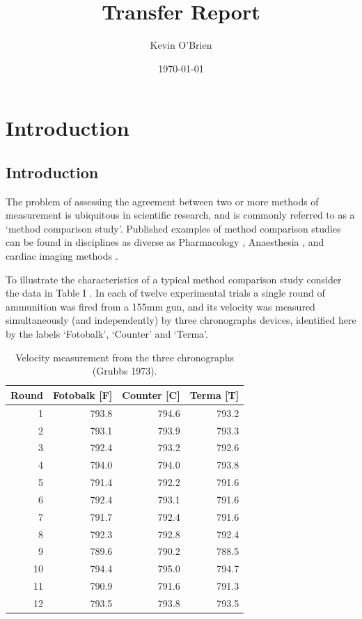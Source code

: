 \documentclass[12pt, a4paper]{report}
\begin{document}
\author{Kevin O'Brien}
\title{Transfer Report}
\date{\today}
\maketitle

\tableofcontents \setcounter{tocdepth}{2}

\newpage
\chapter{Introduction}

\section{Introduction}
The problem of assessing the agreement between two or more methods
of measurement is ubiquitous in scientific research, and is
commonly referred to as a `method comparison study'. Published
examples of method comparison studies can be found in disciplines
as diverse as Pharmacology \citep{ludbrook97}, Anaesthesia
\citep{Myles}, and cardiac imaging methods \citep{Krumm}.
\smallskip

To illustrate the characteristics of a typical method comparison
study consider the data in Table I \citep{Grubbs73}. In each of
twelve experimental trials a single round of ammunition was fired
from a 155mm gun, and its velocity was measured simultaneously
(and independently) by three chronographs devices, identified here
by the labels `Fotobalk', `Counter' and `Terma'.
\smallskip


\newpage

\begin{table}[ht]
\begin{center}
\begin{tabular}{rrrr}
  \hline
  Round& Fotobalk [F] & Counter [C]& Terma [T]\\
  \hline
  1 & 793.8 & 794.6 & 793.2 \\
  2 & 793.1 & 793.9 & 793.3 \\
  3 & 792.4 & 793.2 & 792.6 \\
  4 & 794.0 & 794.0 & 793.8 \\
  5 & 791.4 & 792.2 & 791.6 \\
  6 & 792.4 & 793.1 & 791.6 \\
  7 & 791.7 & 792.4 & 791.6 \\
  8 & 792.3 & 792.8 & 792.4 \\
  9 & 789.6 & 790.2 & 788.5 \\
  10 & 794.4 & 795.0 & 794.7 \\
  11 & 790.9 & 791.6 & 791.3 \\
  12 & 793.5 & 793.8 & 793.5 \\
   \hline
\end{tabular}
\caption{Velocity measurement from the three chronographs (Grubbs
1973).}
\end{center}
\end{table}
\end{document}
